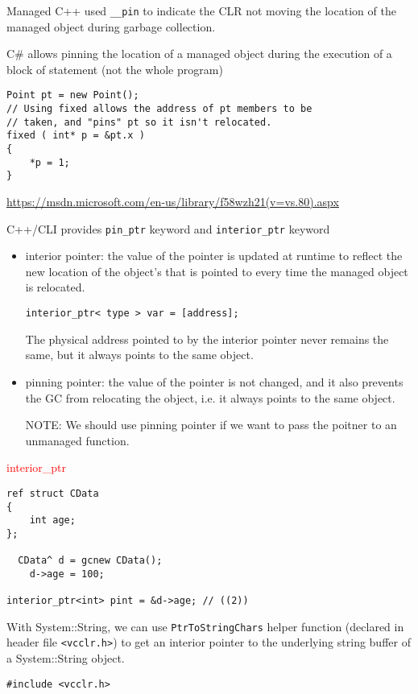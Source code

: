 Managed C++ used \verb!__pin! to indicate the CLR not moving the location of the managed object during garbage collection. 

C\# allows pinning the location of a managed object during the execution of a block of statement (not the whole program)
\begin{verbatim}
Point pt = new Point();
// Using fixed allows the address of pt members to be
// taken, and "pins" pt so it isn't relocated.
fixed ( int* p = &pt.x )
{
    *p = 1; 
}
\end{verbatim}
\url{https://msdn.microsoft.com/en-us/library/f58wzh21(v=vs.80).aspx}

C++/CLI provides \verb!pin_ptr! keyword and \verb!interior_ptr! keyword
\begin{itemize}
  
  \item interior pointer: the value of the pointer is updated at runtime to
  reflect the new location of the object's that is pointed to every time the
  managed object is relocated.
\begin{verbatim}
interior_ptr< type > var = [address];
\end{verbatim}  
  The physical address pointed to by the interior pointer never remains the same, but it always points to the same object. 
  
  \item pinning pointer: the value of the pointer is not changed, and it also prevents the GC from relocating the object, i.e. it always points to the same object.
  
 NOTE: We should use pinning pointer if we want to pass the poitner to an unmanaged function. 
   
\end{itemize}

\textcolor{red}{interior\_ptr}
\begin{Verbatim}
ref struct CData
{
    int age;
};

  CData^ d = gcnew CData();
    d->age = 100;
    
interior_ptr<int> pint = &d->age; // ((2))
\end{Verbatim}

With System::String, we can use \verb!PtrToStringChars! helper function
(declared in header file \verb!<vcclr.h>!) to get an interior pointer to the
underlying string buffer of a System::String object.
\begin{verbatim}
#include <vcclr.h>
\end{verbatim}

